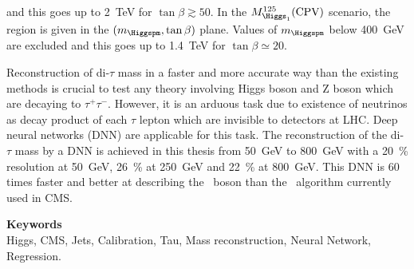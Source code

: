 and this goes up to 
\SI{2}{\TeV} for $\tan\beta\gtrsim\num{50}$.
In the $M_{\Higgs_1}^{125}(\text{CPV})$ scenario,
the region is given in the $(m_{\Higgspm},\tan\beta)$ plane.
Values of $m_{\Higgspm}$ below \SI{400}{\GeV} are excluded
and this goes up to 
\SI{1.4}{\TeV} for $\tan\beta\simeq\num{20}$.
\par
Reconstruction of di-$\tau$ mass in a faster and more accurate way than the existing methods is crucial to test any theory involving Higgs boson and Z boson which are decaying to $\tau^+ \tau^-$. 
However, it is an arduous task due to existence of neutrinos as decay product of each $\tau$ lepton which are invisible to detectors at LHC. 
Deep neural networks (DNN) are applicable for this task. 
The reconstruction of the di-$\tau$ mass by a DNN
is achieved in this thesis
from 
\SI{50}{\GeV} to \SI{800}{\GeV}
with a
\SI{20}{\%} resolution at \SI{50}{\GeV},
\SI{26}{\%} at \SI{250}{\GeV} and
\SI{22}{\%} at \SI{800}{\GeV}.
This DNN is
60 times faster
and
better at describing the \Zboson~boson
than the \SVFIT\ algorithm currently used in CMS.

\vfill

\noindent\textbf{\Large\sffamily Keywords}\\
Higgs,
CMS,
Jets,
Calibration,
Tau,
Mass reconstruction,
Neural Network,
Regression.

\vspace{2\baselineskip}